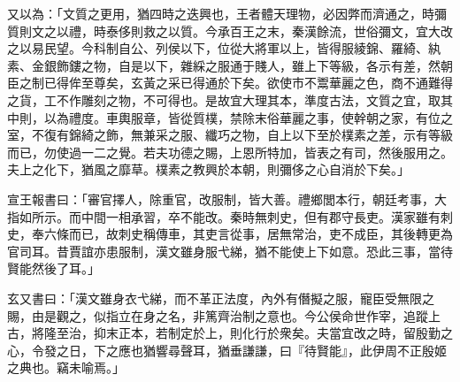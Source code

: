 \begin{pinyinscope}
 
 
 
 又以為：「文質之更用，猶四時之迭興也，王者體天理物，必因弊而濟通之，時彌質則文之以禮，時泰侈則救之以質。今承百王之末，秦漢餘流，世俗彌文，宜大改之以易民望。今科制自公、列侯以下，位從大將軍以上，皆得服綾錦、羅綺、紈素、金銀飾鏤之物，自是以下，雜綵之服通于賤人，雖上下等級，各示有差，然朝臣之制已得侔至尊矣，玄黃之采已得通於下矣。欲使市不鬻華麗之色，商不通難得之貨，工不作雕刻之物，不可得也。是故宜大理其本，準度古法，文質之宜，取其中則，以為禮度。車輿服章，皆從質樸，禁除末俗華麗之事，使幹朝之家，有位之室，不復有錦綺之飾，無兼采之服、纖巧之物，自上以下至於樸素之差，示有等級而已，勿使過一二之覺。若夫功德之賜，上恩所特加，皆表之有司，然後服用之。夫上之化下，猶風之靡草。樸素之教興於本朝，則彌侈之心自消於下矣。」
 
 
 
 
 宣王報書曰：「審官擇人，除重官，改服制，皆大善。禮鄉閭本行，朝廷考事，大指如所示。而中間一相承習，卒不能改。秦時無刺史，但有郡守長吏。漢家雖有刺史，奉六條而已，故刺史稱傳車，其吏言從事，居無常治，吏不成臣，其後轉更為官司耳。昔賈誼亦患服制，漢文雖身服弋綈，猶不能使上下如意。恐此三事，當待賢能然後了耳。」
 
 
 
 
 玄又書曰：「漢文雖身衣弋綈，而不革正法度，內外有僭擬之服，寵臣受無限之賜，由是觀之，似指立在身之名，非篤齊治制之意也。今公侯命世作宰，追蹤上古，將隆至治，抑末正本，若制定於上，則化行於衆矣。夫當宜改之時，留殷勤之心，令發之日，下之應也猶響尋聲耳，猶垂謙謙，曰『待賢能』，此伊周不正殷姬之典也。竊未喻焉。」
 

\end{pinyinscope}
